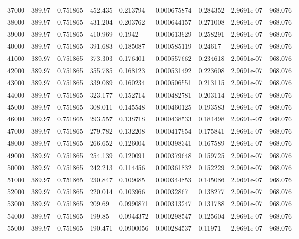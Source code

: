 \begin{tabular}{lllllllll}
37000 & 389.97 & 0.751865 & 452.435 & 0.213794 & 0.000675874 & 0.284352 & 2.9691e-07 & 968.076 \\
38000 & 389.97 & 0.751865 & 431.204 & 0.203762 & 0.000644157 & 0.271008 & 2.9691e-07 & 968.076 \\
39000 & 389.97 & 0.751865 & 410.969 & 0.1942 & 0.000613929 & 0.258291 & 2.9691e-07 & 968.076 \\
40000 & 389.97 & 0.751865 & 391.683 & 0.185087 & 0.000585119 & 0.24617 & 2.9691e-07 & 968.076 \\
41000 & 389.97 & 0.751865 & 373.303 & 0.176401 & 0.000557662 & 0.234618 & 2.9691e-07 & 968.076 \\
42000 & 389.97 & 0.751865 & 355.785 & 0.168123 & 0.000531492 & 0.223608 & 2.9691e-07 & 968.076 \\
43000 & 389.97 & 0.751865 & 339.089 & 0.160234 & 0.000506551 & 0.213115 & 2.9691e-07 & 968.076 \\
44000 & 389.97 & 0.751865 & 323.177 & 0.152714 & 0.000482781 & 0.203114 & 2.9691e-07 & 968.076 \\
45000 & 389.97 & 0.751865 & 308.011 & 0.145548 & 0.000460125 & 0.193583 & 2.9691e-07 & 968.076 \\
46000 & 389.97 & 0.751865 & 293.557 & 0.138718 & 0.000438533 & 0.184498 & 2.9691e-07 & 968.076 \\
47000 & 389.97 & 0.751865 & 279.782 & 0.132208 & 0.000417954 & 0.175841 & 2.9691e-07 & 968.076 \\
48000 & 389.97 & 0.751865 & 266.652 & 0.126004 & 0.000398341 & 0.167589 & 2.9691e-07 & 968.076 \\
49000 & 389.97 & 0.751865 & 254.139 & 0.120091 & 0.000379648 & 0.159725 & 2.9691e-07 & 968.076 \\
50000 & 389.97 & 0.751865 & 242.213 & 0.114456 & 0.000361832 & 0.152229 & 2.9691e-07 & 968.076 \\
51000 & 389.97 & 0.751865 & 230.847 & 0.109085 & 0.000344853 & 0.145086 & 2.9691e-07 & 968.076 \\
52000 & 389.97 & 0.751865 & 220.014 & 0.103966 & 0.00032867 & 0.138277 & 2.9691e-07 & 968.076 \\
53000 & 389.97 & 0.751865 & 209.69 & 0.0990871 & 0.000313247 & 0.131788 & 2.9691e-07 & 968.076 \\
54000 & 389.97 & 0.751865 & 199.85 & 0.0944372 & 0.000298547 & 0.125604 & 2.9691e-07 & 968.076 \\
55000 & 389.97 & 0.751865 & 190.471 & 0.0900056 & 0.000284537 & 0.11971 & 2.9691e-07 & 968.076 \\

\end{tabular}
